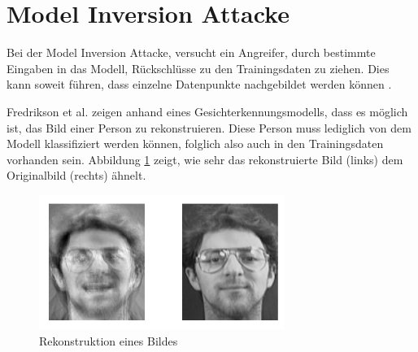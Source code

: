 \section{Model Inversion Attacke}\label{sec:model_inversion}

Bei der Model Inversion Attacke, versucht ein Angreifer, durch bestimmte Eingaben in das Modell, Rückschlüsse zu den Trainingsdaten zu ziehen. Dies kann soweit führen, dass einzelne Datenpunkte nachgebildet werden können \cite{P-3}. 

Fredrikson et al. \cite{P-3} zeigen anhand eines Gesichterkennungsmodells, dass es möglich ist, das Bild einer Person zu rekonstruieren.
Diese Person muss lediglich von dem Modell klassifiziert werden können, folglich also auch in den Trainingsdaten vorhanden sein.
Abbildung \ref{fig:mi_attacke} zeigt, wie sehr das rekonstruierte Bild (links) dem Originalbild (rechts) ähnelt.

\begin{figure}[!htb]
    \centering
    \includegraphics[width=8cm]{figures/mi_attack}
    \caption{Rekonstruktion eines Bildes \cite{P-3}}
    \label{fig:mi_attacke}
\end{figure} 

